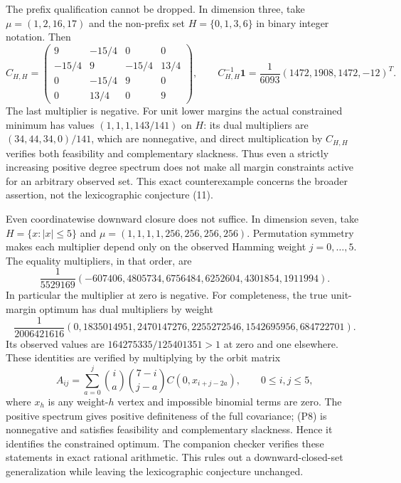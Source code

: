 \documentclass[11pt]{article}
\newcommand{\one}{\mathbf1}
\begin{document}
The prefix qualification cannot be dropped. In dimension three, take
$\mu=(1,2,16,17)$ and the non-prefix set $H=\{0,1,3,6\}$ in binary
integer notation. Then
\[
 C_{H,H}=\begin{pmatrix}
 9&-15/4&0&0\\-15/4&9&-15/4&13/4\\
 0&-15/4&9&0\\0&13/4&0&9
 \end{pmatrix},\qquad
 C_{H,H}^{-1}\one=\frac1{6093}(1472,1908,1472,-12)^T.
\]
The last multiplier is negative. For unit lower margins the actual
constrained minimum has values $(1,1,1,143/141)$ on $H$: its dual
multipliers are $(34,44,34,0)/141$, which are nonnegative, and direct
multiplication by $C_{H,H}$ verifies both feasibility and complementary
slackness. Thus even a strictly increasing positive degree spectrum does
not make all margin constraints active for an arbitrary observed set.
This exact counterexample concerns the broader assertion, not the
lexicographic conjecture (11).

Even coordinatewise downward closure does not suffice. In dimension
seven, take $H=\{x:|x|\le5\}$ and
$\mu=(1,1,1,1,256,256,256,256)$. Permutation symmetry makes each
multiplier depend only on the observed Hamming weight $j=0,\ldots,5$.
The equality multipliers, in that order, are
\[
 \frac1{5529169}(-607406,4805734,6756484,6252604,4301854,1911994).
                                                               \tag{P7}
\]
In particular the multiplier at zero is negative. For completeness,
the true unit-margin optimum has dual multipliers by weight
\[
 \frac1{2006421616}
 (0,1835014951,2470147276,2255272546,1542695956,684722701).
                                                               \tag{P8}
\]
Its observed values are $164275335/125401351>1$ at zero and one
elsewhere. These identities are verified by multiplying by the orbit
matrix
\[
 A_{ij}=\sum_{a=0}^j\binom ia\binom{7-i}{j-a}
                         C(0,x_{i+j-2a}),\qquad 0\le i,j\le5,
                                                               \tag{P9}
\]
where $x_h$ is any weight-$h$ vertex and impossible binomial terms
are zero. The positive spectrum gives positive definiteness of the
full covariance; (P8) is nonnegative and satisfies feasibility and
complementary slackness. Hence it identifies the constrained optimum.
The companion checker verifies these statements in exact rational
arithmetic. This rules out a downward-closed-set generalization while
leaving the lexicographic conjecture unchanged.
\end{document}
